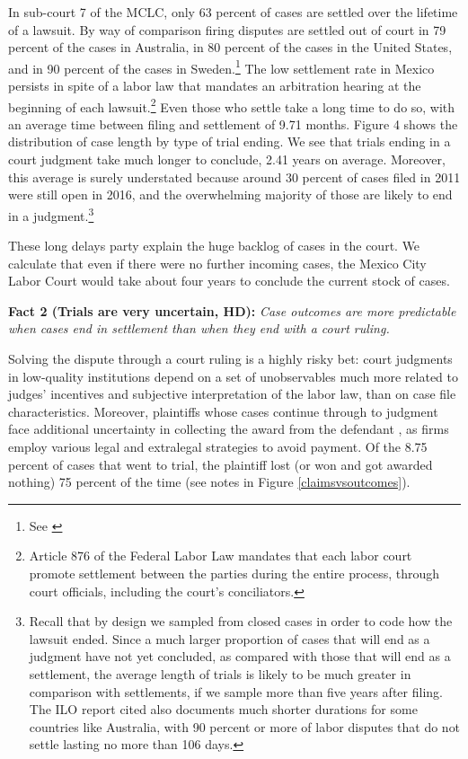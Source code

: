 \documentclass[11pt]{article}
\begin{document}
In sub-court 7 of the MCLC, only 63 percent of cases are settled over the lifetime of a lawsuit. By way of comparison firing disputes are settled out of court in 79 percent of the cases in Australia, in 80 percent of the cases in the United States, and in 90 percent of the cases in Sweden.\footnote{See \cite{ILO_ComparativeOverview}} The low settlement rate in Mexico persists in spite of a labor law that mandates an arbitration hearing at the beginning of each lawsuit.\footnote{Article 876 of the Federal Labor Law mandates that each labor court promote settlement between the parties during the entire process, through court officials, including the court's conciliators.} Even those who settle take a long time to do so, with an average time between filing and settlement of 9.71 months. Figure 4 shows the distribution of case length by type of trial ending. We see that trials ending in a court judgment take much longer to conclude, 2.41 years on average. Moreover, this average is surely understated because around 30 percent of cases filed  in 2011 were still open in 2016, and the overwhelming majority of those are likely to end in a judgment.\footnote{Recall that by design we sampled from closed cases in order to code how the lawsuit ended. Since a much larger proportion of cases that will end as a judgment have not yet concluded, as compared with those that will end as a settlement, the average length of trials is likely to be much greater in comparison with settlements, if we sample more than five years after filing. The ILO report cited also documents much shorter durations for some countries like Australia, with 90 percent or more of labor disputes that do not settle lasting no more than 106 days.}  

These long delays party explain the huge backlog of cases in the court. We calculate that even if there were no further incoming cases, the Mexico City Labor Court would take about four years to conclude the current stock of cases.

\vspace{.3in}
\begin{singlespace}
\textbf{Fact 2 (Trials are very uncertain, HD):} \emph{Case outcomes are more predictable when cases end in settlement than when they end with a court ruling.}
\end{singlespace}
\vspace{.1in}

Solving the dispute through a court ruling is a highly risky bet: court judgments in low-quality institutions depend on a set of unobservables much more related to judges' incentives and subjective interpretation of the labor law, than on case file characteristics. Moreover, plaintiffs whose cases continue through to judgment face additional uncertainty in collecting the award from the defendant \cite{KaplanSadkaSilvaMendez_LitigationSettlement}, as firms employ various legal and extralegal strategies to avoid payment. Of the 8.75 percent of cases that went to trial, the plaintiff lost (or won and got awarded nothing) 75 percent of the time (see notes in Figure \ref{claimsvsoutcomes}).
\end{document}
